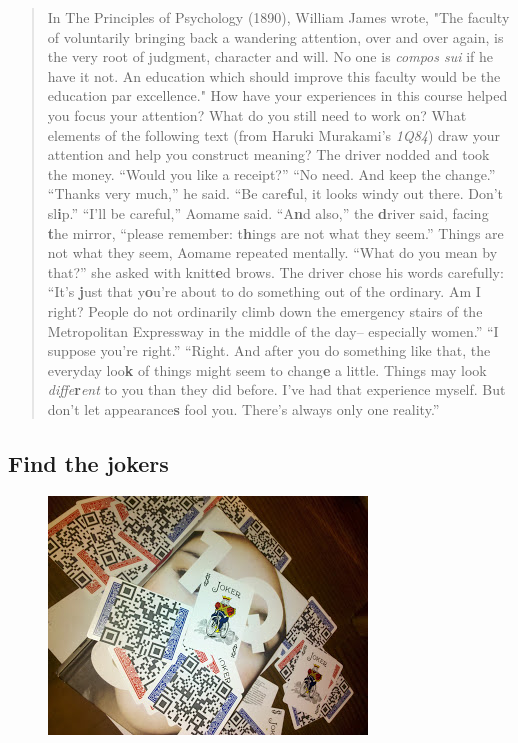 \begin{quote}
In The Principles of Psychology (1890), William James wrote, "The
faculty of voluntarily bringing back a wandering attention, over and
over again, is the very root of judgment, character and will. No one is
\emph{compos sui} if he have it not. An education which should improve
this faculty would be the education par excellence." How have your
experiences in this course helped you focus your attention? What do you
still need to work on? What elements of the following text (from Haruki
Murakami's \emph{1Q84}) draw your attention and help you construct
meaning? The driver nodded and took the money. ``Would you like a
receipt?'' ``No need. And keep the change.'' ``Thanks very much,'' he
said. ``Be care\textbf{f}ul, it looks windy out there. Don't
sl\textbf{i}p.'' ``I'll be careful,'' Aomame said. ``A\textbf{n}d
also,'' the \textbf{d}river said, facing \textbf{t}he mirror, ``please
remember: t\textbf{h}ings are not what they seem.'' Things are not what
they seem, Aomame repeated mentally. ``What do you mean by that?'' she
asked with knitt\textbf{e}d brows. The driver chose his words carefully:
``It's \textbf{j}ust that y\textbf{o}u're about to do something out of
the ordinary. Am I right? People do not ordinarily climb down the
emergency stairs of the Metropolitan Expressway in the middle of the
day-- especially women.'' ``I suppose you're right.'' ``Right. And after
you do something like that, the everyday loo\textbf{k} of things might
seem to chang\textbf{e} a little. Things may look
\emph{diffe}\textbf{r}\hspace{-.07em}\emph{ent} to you than they did before. I've had that
experience myself. But don't let appearance\textbf{s} fool you. There's
always only one reality.''
\end{quote}
\subsection{Find the jokers}

\begin{figure}
\centering
\includegraphics[width=.8\textwidth]{../pictures/jokers.jpg}
\end{figure}


